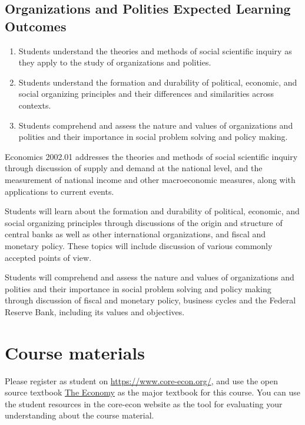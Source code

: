 \documentclass[12pt]{article}
\begin{document}
\subsection*{Organizations and Polities Expected Learning Outcomes}
\begin{enumerate}
    \item Students understand the theories and methods of social scientific inquiry as they apply to the study of organizations and polities.
    \item Students understand the formation and durability of political, economic, and social organizing principles and their differences and similarities across contexts.
    \item Students comprehend and assess the nature and values of organizations and polities and their importance in social problem solving and policy making.
\end{enumerate}

Economics 2002.01 addresses the theories and methods of social scientific inquiry through discussion of supply and demand at the national level, and the measurement of national income and other macroeconomic measures, along with applications to current events.

Students will learn about the formation and durability of political, economic, and social organizing principles through discussions of the origin and structure of central banks as well as other international organizations, and fiscal and monetary policy. These topics will include discussion of various commonly accepted points of view.

Students will comprehend and assess the nature and values of organizations and polities and their importance in social problem solving and policy making through discussion of fiscal and monetary policy, business cycles and the Federal Reserve Bank, including its values and objectives.

\section*{Course materials}

Please register as student on \href{https://www.core-econ.org/}{https://www.core-econ.org/}, and use the open source textbook \href{https://www.core-econ.org/the-economy/book/text/0-3-contents.html}{The Economy} as the major textbook for this course.
You can use the student resources in the core-econ website as the tool for evaluating your understanding about the course material.






\printbibliography
\end{document}
